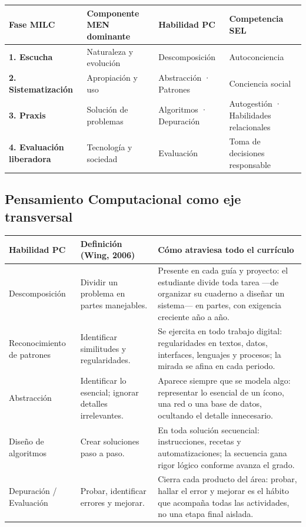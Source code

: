 \documentclass[12pt, a4paper]{article}
\begin{document}
\begin{center}
\begin{tabular}{|L{3cm}|L{4cm}|L{3.5cm}|L{3.5cm}|}
\hline
{}
\color{white}\textbf{Fase MILC} &
\color{white}\textbf{Componente MEN dominante} &
\color{white}\textbf{Habilidad PC} &
\color{white}\textbf{Competencia SEL} \\
\hline
\textbf{1. Escucha} &
Naturaleza y evolución &
Descomposición &
Autoconciencia \\
\hline
\textbf{2. Sistematización} &
Apropiación y uso &
Abstracción · Patrones &
Conciencia social \\
\hline
\textbf{3. Praxis} &
Solución de problemas &
Algoritmos · Depuración &
Autogestión · Habilidades relacionales \\
\hline
\textbf{4. Evaluación liberadora} &
Tecnología y sociedad &
Evaluación &
Toma de decisiones responsable \\
\hline
\end{tabular}
\end{center}

\subsection{Pensamiento Computacional como eje transversal}

\begin{center}
\begin{tabular}{|L{3cm}|L{4.5cm}|L{6cm}|}
\hline
{}
\color{white}\textbf{Habilidad PC} &
\color{white}\textbf{Definición (Wing, 2006)} &
\color{white}\textbf{Cómo atraviesa todo el currículo} \\
\hline
Descomposición &
Dividir un problema en partes manejables. &
Presente en cada guía y proyecto: el estudiante divide toda tarea —de organizar
su cuaderno a diseñar un sistema— en partes, con exigencia creciente año a año. \\
\hline
Reconocimiento de patrones &
Identificar similitudes y regularidades. &
Se ejercita en todo trabajo digital: regularidades en textos, datos, interfaces,
lenguajes y procesos; la mirada se afina en cada periodo. \\
\hline
Abstracción &
Identificar lo esencial; ignorar detalles irrelevantes. &
Aparece siempre que se modela algo: representar lo esencial de un ícono, una red
o una base de datos, ocultando el detalle innecesario. \\
\hline
Diseño de algoritmos &
Crear soluciones paso a paso. &
En toda solución secuencial: instrucciones, recetas y automatizaciones; la
secuencia gana rigor lógico conforme avanza el grado. \\
\hline
Depuración / Evaluación &
Probar, identificar errores y mejorar. &
Cierra cada producto del área: probar, hallar el error y mejorar es el hábito que
acompaña todas las actividades, no una etapa final aislada. \\
\hline
\end{tabular}
\end{center}
\end{document}
